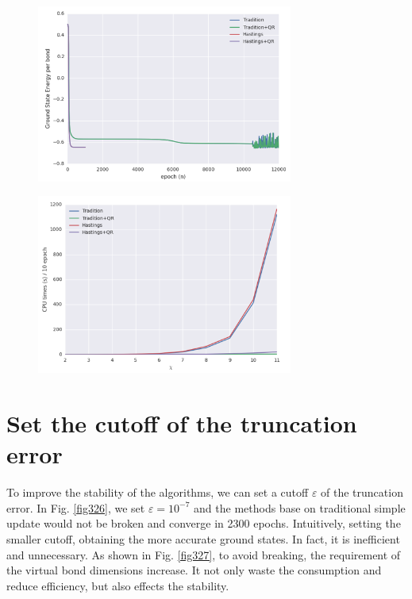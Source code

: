 \begin{figure}[ht]
	\centering
	\includegraphics[width=0.75\textwidth]{figures/fig325.png}
	\caption[CPU times of different 2D-iTEBD with dynamic trucation error]{}
	\label{fig325}
\end{figure}

\begin{figure}[ht]
	\centering
	\includegraphics[width=0.75\textwidth]{figures/fig324.png}
	\caption[CPU times of different 2D-iTEBD with fixed trucation error]{}
	\label{fig324}
\end{figure}

\section{Set the cutoff of the truncation error}

To improve the stability of the algorithms, we can set a cutoff $\varepsilon$ of the truncation error. In Fig. \ref{fig326}, we set $\varepsilon = 10^{-7}$ and the methods base on traditional simple update would not be broken and converge in 2300 epochs. Intuitively, setting the smaller cutoff, obtaining the more accurate ground states. In fact,  it is inefficient and unnecessary. As shown in Fig. \ref{fig327}, to avoid breaking, the requirement of the virtual bond dimensions increase. It not only waste the consumption and reduce efficiency, but also effects the stability. 

